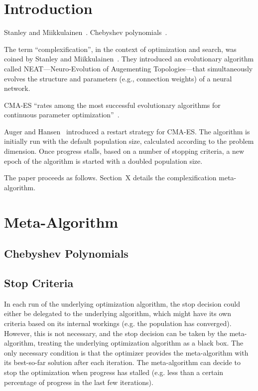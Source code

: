 \documentclass{sig-alternate}
\begin{document}



\section{Introduction} 
Stanley and Miikkulainen~\cite{Stanley:2002:a}.
Chebyshev polynomials~\cite{Mason:2010:a, Rivlin:1974:a}.

The term ``complexification'', in the context of optimization and search, was coined by Stanley and Miikkulainen~\cite{Stanley:2002:a}. They introduced an evolutionary algorithm called NEAT---Neuro-Evolution of Augementing Topologies---that simultaneously evolves the structure and parameters (e.g., connection weights) of a neural network.

CMA-ES ``rates among the most successful evolutionary algorithms for continuous parameter optimization''~\cite{Beyer:2008:a}.

Auger and Hansen~\cite{Auger:2005:a} introduced a restart strategy for CMA-ES. The algorithm is initially run with the default population size, calculated according to the problem dimension. Once progress stalls, based on a number of stopping criteria, a new epoch of the algorithm is started with a doubled population size.

The paper proceeds as follows. Section~X details the complexification meta-algorithm.

\section{Meta-Algorithm}
\subsection{Chebyshev Polynomials}
\subsection{Stop Criteria}
In each run of the underlying optimization algorithm, the stop decision could either be delegated to the underlying algorithm, which might have its own criteria based on its internal workings (e.g. the population has converged). However, this is not necessary, and the stop decision can be taken by the meta-algorithm, treating the underlying optimization algorithm as a black box. The only necessary condition is that the optimizer provides the meta-algorithm with its best-so-far solution after each iteration. The meta-algorithm can decide to stop the optimization when progress has stalled (e.g. less than a certain percentage of progress in the last few iterations).
\end{document}
